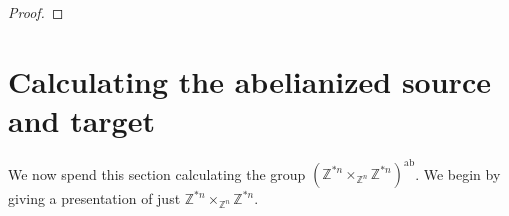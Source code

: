 \documentclass{amsbook} %
\newcommand{\quotient}[2]{ \raisebox{0.5\height}{$#1$} \mkern-5mu\diagup\mkern-4mu \raisebox{-0.5\height}{$#2$} }
\newcommand{\bigquotient}[2]{ \raisebox{0.75\height}{$#1$} \mkern-12mu\scalebox{2}{$\diagup$}\mkern-10mu \raisebox{-0.5\height}{$#2$} }
\numberwithin{section}{chapter}
\begin{document}
\begin{proof}

\end{proof}

\section{Calculating the abelianized source and target}
 

We now spend this section calculating the group $(\mathbb{Z}^{\ast n} \times_{\mathbb{Z}^n} \mathbb{Z}^{\ast n})^\mathrm{{ab}}$. We begin by giving a presentation of just $\mathbb{Z}^{\ast n} \times_{\mathbb{Z}^n} \mathbb{Z}^{\ast n}$.
\end{document}
